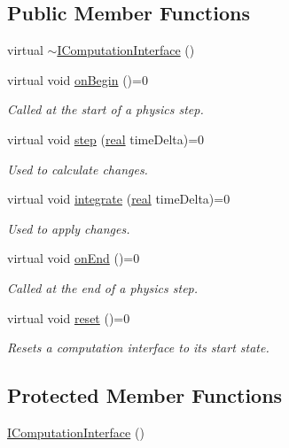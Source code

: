 \subsection*{Public Member Functions}
\begin{DoxyCompactItemize}
\item 
virtual \mbox{\hyperlink{classr3_1_1_i_computation_interface_a88c5734b5636745f0200c03adac30994}{$\sim$\+I\+Computation\+Interface}} ()
\item 
virtual void \mbox{\hyperlink{classr3_1_1_i_computation_interface_a430ebc9cb8d4ba064ac6a032ef07edd7}{on\+Begin}} ()=0
\begin{DoxyCompactList}\small\item\em Called at the start of a physics step. \end{DoxyCompactList}\item 
virtual void \mbox{\hyperlink{classr3_1_1_i_computation_interface_aaa12bcc35005f32a1984b38de97696cb}{step}} (\mbox{\hyperlink{namespacer3_ab2016b3e3f743fb735afce242f0dc1eb}{real}} time\+Delta)=0
\begin{DoxyCompactList}\small\item\em Used to calculate changes. \end{DoxyCompactList}\item 
virtual void \mbox{\hyperlink{classr3_1_1_i_computation_interface_a162250f2b6efbd85460bd0f780d42cff}{integrate}} (\mbox{\hyperlink{namespacer3_ab2016b3e3f743fb735afce242f0dc1eb}{real}} time\+Delta)=0
\begin{DoxyCompactList}\small\item\em Used to apply changes. \end{DoxyCompactList}\item 
virtual void \mbox{\hyperlink{classr3_1_1_i_computation_interface_acae0c5fada7e414c74fe6f5a8f4a6c7d}{on\+End}} ()=0
\begin{DoxyCompactList}\small\item\em Called at the end of a physics step. \end{DoxyCompactList}\item 
virtual void \mbox{\hyperlink{classr3_1_1_i_computation_interface_a6069989c54ffd4e714788d0968851007}{reset}} ()=0
\begin{DoxyCompactList}\small\item\em Resets a computation interface to its start state. \end{DoxyCompactList}\end{DoxyCompactItemize}
\subsection*{Protected Member Functions}
\begin{DoxyCompactItemize}
\item 
\mbox{\hyperlink{classr3_1_1_i_computation_interface_aa7ec35b2ab0cccd1a94ebdfeccc7bb43}{I\+Computation\+Interface}} ()
\end{DoxyCompactItemize}



